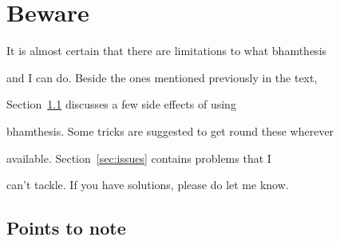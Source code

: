 \documentclass{bhamthesis}
\newcommand{\clsname}{\pkg{bhamthesis}}
\newcommand{\pkg}[1]{\textsf{#1}}
\begin{document}
\chapter{Beware}\label{ch:beware}

It is almost certain that there are limitations to what \clsname\

and I can do.  Beside the ones mentioned previously in the text,

Section~\ref{sec:pts2note} discusses a few side effects of using

\clsname.  Some tricks are suggested to get round these wherever

available.  Section~\ref{sec:issues} contains problems that I

can't tackle.  If you have solutions, please do let me know.



\section{Points to note}\label{sec:pts2note}
\end{document}
